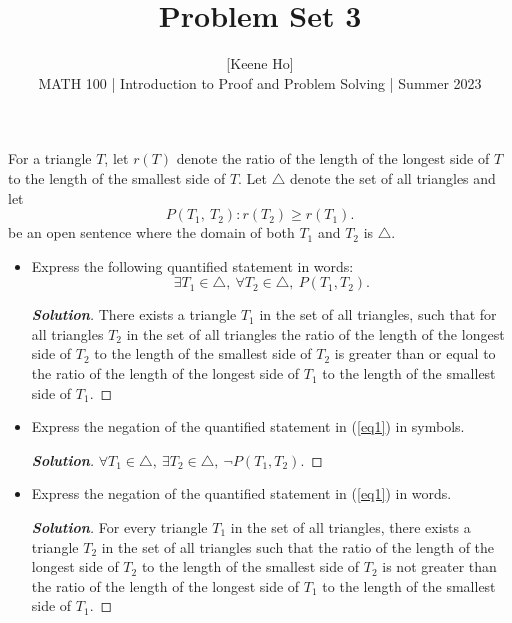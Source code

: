 \documentclass[11pt]{article}
\newenvironment{problem}[2][Problem\!]{\begin{trivlist}
\item[\hskip \labelsep {\bfseries #1}\hskip \labelsep {\bfseries #2.}]}{\end{trivlist}}
\newenvironment{solution}{\begin{proof}[\textbf{\textit{Solution}}]}{\end{proof}}
\renewcommand{\geq}{\geqslant}
\begin{document}
 
\title{Problem Set 3}
\author{[Keene Ho]\\[0.5em]
MATH 100 | Introduction to Proof and Problem Solving | Summer 2023}
\date{} 
\maketitle


\begin{problem}{3.1}
For a triangle $T$, let $r(T)$ denote the ratio of the length of the longest side of $T$ to the length of the smallest side of $T$. Let $\triangle$ denote the set of all triangles and let
\[P(T_1,\ T_2): r(T_2) \geq r(T_1).\]
be an open sentence where the domain of both $T_1$ and $T_2$ is $\triangle$.
\begin{itemize}[itemsep=3em]
\item[(a)] Express the following quantified statement in words:
\begin{equation}\label{eq1}
\exists T_1 \in \triangle,\ \forall T_2 \in \triangle,\ P(T_1, T_2).\tag{$*$}
\end{equation}
\begin{solution}
There exists a triangle \(T_1\) in the set of all triangles, such that for all triangles \(T_2\) in the set of all triangles the ratio of the length of the longest side of \(T_2\) to the length of the smallest side of \(T_2\) is greater than or equal to the ratio of the length of the longest side of \(T_1\) to the length of the smallest side of \(T_1\).
\end{solution}

\item[(b)] Express the negation of the quantified statement in (\ref{eq1}) in symbols.
\begin{solution}
\(\forall T_1 \in \triangle,\ \exists T_2 \in \triangle,\ \neg P(T_1, T_2)\). 
\end{solution}

\item[(c)] Express the negation of the quantified statement in (\ref{eq1}) in words.
\begin{solution}
For every triangle \(T_1\) in the set of all triangles, there exists a triangle \(T_2\) in the set of all triangles such that the ratio of the length of the longest side of \(T_2\) to the length of the smallest side of \(T_2\) is not greater than the ratio of the length of the longest side of \(T_1\) to the length of the smallest side of \(T_1\).
\end{solution}

\end{itemize}
\end{problem}
\end{document}
